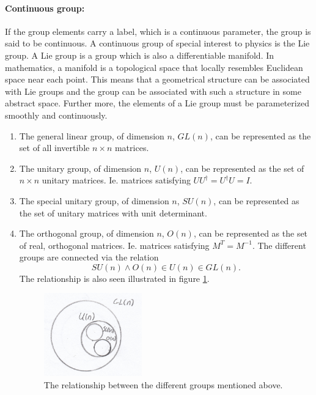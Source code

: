 \paragraph{Continuous group: }
If the group elements carry a label, which is a continuous parameter, the group is said to be continuous. A continuous group of special interest to physics is the Lie group. A Lie group is a group which is also a differentiable manifold. In mathematics, a manifold is a topological space that locally resembles Euclidean space near each point. This means that a geometrical structure can be associated with Lie groups and the group can be associated with such a structure in some abstract space. Further more, the elements of a Lie group must be parameterized smoothly and continuously.
\begin{example}
	\begin{enumerate}
		\item The general linear group, of dimension $n$, $GL(n)$, can be represented as the set of all invertible $n\times n$ matrices.
		\item The unitary group, of dimension $n$, $U(n)$, can be represented as the set of $n\times n$ unitary matrices. Ie. matrices satisfying $UU^\dagger=U^\dagger U=I$.
		\item The special unitary group, of dimension $n$, $SU(n)$, can be represented as the set of unitary matrices with unit determinant.
		\item The orthogonal group, of dimension $n$, $O(n)$, can be represented as the set of real, orthogonal matrices. Ie. matrices satisfying $M^T=M^{-1}$. The different groups are connected via the relation
		\begin{equation}
			SU(n)\wedge O(n)\in U(n)\in GL(n).
		\end{equation} 
		The relationship is also seen illustrated in figure \ref{fig:2}.
		\begin{figure}[h]
			\captionsetup{width=1\textwidth}
			\centering
			\includegraphics[width=0.4\textwidth]{figures//2}
			\caption{The relationship between the different groups mentioned above.}
			\label{fig:2}
		\end{figure}
	\end{enumerate}
\end{example}

